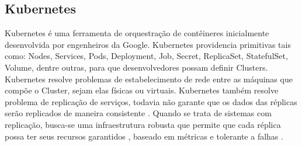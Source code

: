 


\subsection{Kubernetes}

Kubernetes é uma ferramenta de orquestração de contêineres inicialmente desenvolvida por engenheiros da Google. Kubernetes providencia primitivas tais como: Nodes, Services, Pods, Deployment, Job, Secret, ReplicaSet, StatefulSet, Volume, dentre outras, para que desenvolvedores possam definir Clusters. Kubernetes resolve problemas de estabelecimento de rede entre as máquinas que compõe o Cluster, sejam elas físicas ou virtuais. Kubernetes também resolve problema de replicação de serviços, todavia não garante que os dados das réplicas serão replicados de maneira consistente \cite{kubernetes/docs/2022}. Quando se trata de sistemas com replicação, busca-se uma infraestrutura robusta que permite que cada réplica possa ter seus recursos garantidos \cite{Stubbs2015DistributedSO}, baseado em métricas e tolerante a falhas \cite{vayghan2021kubernetes}.

